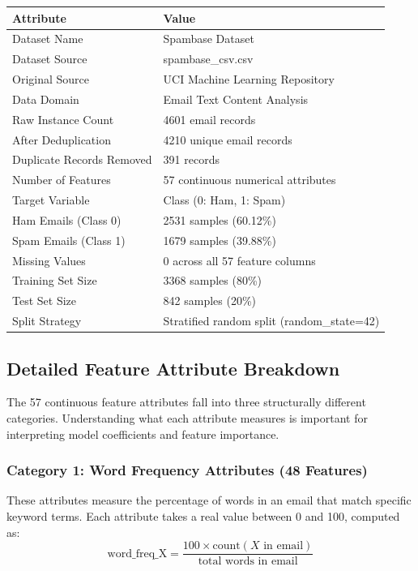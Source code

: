 \documentclass[12pt,a4paper]{article}
\begin{document}
\begin{longtable}{|p{6cm}|p{8cm}|}
\hline
\textbf{Attribute} & \textbf{Value} \\ \hline
Dataset Name & Spambase Dataset \\ \hline
Dataset Source & spambase\_csv.csv \\ \hline
Original Source & UCI Machine Learning Repository \\ \hline
Data Domain & Email Text Content Analysis \\ \hline
Raw Instance Count & 4601 email records \\ \hline
After Deduplication & 4210 unique email records \\ \hline
Duplicate Records Removed & 391 records \\ \hline
Number of Features & 57 continuous numerical attributes \\ \hline
Target Variable & Class (0: Ham, 1: Spam) \\ \hline
Ham Emails (Class 0) & 2531 samples (60.12\%) \\ \hline
Spam Emails (Class 1) & 1679 samples (39.88\%) \\ \hline
Missing Values & 0 across all 57 feature columns \\ \hline
Training Set Size & 3368 samples (80\%) \\ \hline
Test Set Size & 842 samples (20\%) \\ \hline
Split Strategy & Stratified random split (random\_state=42) \\ \hline
\end{longtable}

\subsection*{Detailed Feature Attribute Breakdown}

The 57 continuous feature attributes fall into three structurally different categories. Understanding what each attribute measures is important for interpreting model coefficients and feature importance.

\subsubsection*{Category 1: Word Frequency Attributes (48 Features)}
These attributes measure the percentage of words in an email that match specific keyword terms. Each attribute takes a real value between 0 and 100, computed as:
\begin{equation}
\text{word\_freq\_X} = \frac{100 \times \text{count}(X \text{ in email})}{\text{total words in email}}
\end{equation}
\end{document}
